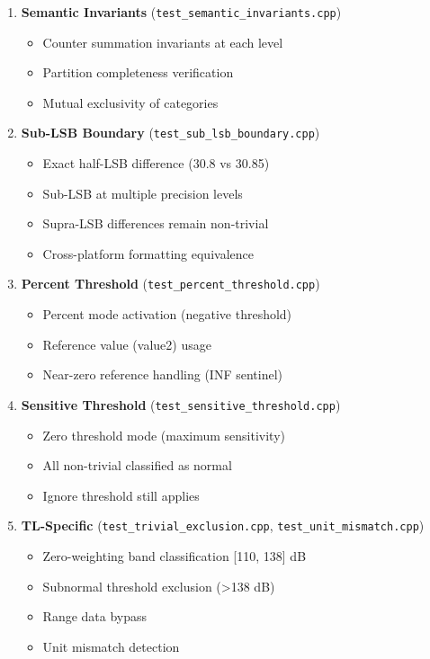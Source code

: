 \documentclass[11pt,letterpaper]{article}
\begin{document}
\begin{enumerate}
    \item \textbf{Semantic Invariants} (\texttt{test\_semantic\_invariants.cpp})
    \begin{itemize}
        \item Counter summation invariants at each level
        \item Partition completeness verification
        \item Mutual exclusivity of categories
    \end{itemize}

    \item \textbf{Sub-LSB Boundary} (\texttt{test\_sub\_lsb\_boundary.cpp})
    \begin{itemize}
        \item Exact half-LSB difference (30.8 vs 30.85)
        \item Sub-LSB at multiple precision levels
        \item Supra-LSB differences remain non-trivial
        \item Cross-platform formatting equivalence
    \end{itemize}

    \item \textbf{Percent Threshold} (\texttt{test\_percent\_threshold.cpp})
    \begin{itemize}
        \item Percent mode activation (negative threshold)
        \item Reference value (value2) usage
        \item Near-zero reference handling (INF sentinel)
    \end{itemize}

    \item \textbf{Sensitive Threshold} (\texttt{test\_sensitive\_threshold.cpp})
    \begin{itemize}
        \item Zero threshold mode (maximum sensitivity)
        \item All non-trivial classified as normal
        \item Ignore threshold still applies
    \end{itemize}

    \item \textbf{TL-Specific} (\texttt{test\_trivial\_exclusion.cpp}, \texttt{test\_unit\_mismatch.cpp})
    \begin{itemize}
        \item Zero-weighting band classification [110, 138] dB
        \item Subnormal threshold exclusion (>138 dB)
        \item Range data bypass
        \item Unit mismatch detection
    \end{itemize}
\end{enumerate}
\end{document}
